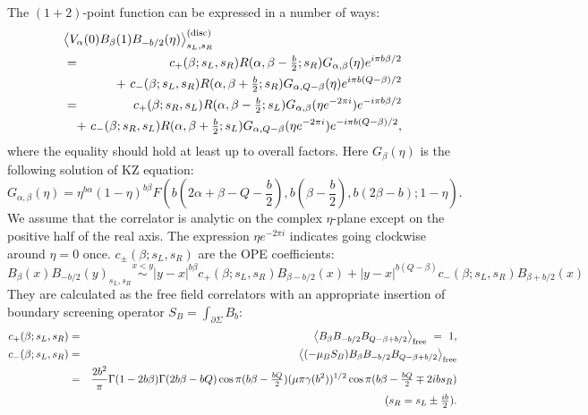 \documentclass[a4paper,11pt]{article}
\newcommand{\vev}[1]{\left<{#1}\right>}
\newcommand{\tfrac}[2]{{\textstyle\frac{#1}{#2}}}
\begin{document}
   The $(1+2)$-point function can be expressed in a number of ways:
\begin{eqnarray}
\lefteqn{
  \vev{V_\alpha(0)B_\beta(1)B_{-b/2}(\eta)}^{\rm (disc)}_{s_L,s_R}
}\nonumber \\
 &=& c_+(\beta;s_L,s_R)R(\alpha,\beta-\tfrac{b}{2};s_R)
     G_{\alpha,\beta}(\eta)e^{i\pi b\beta/2}
 \nonumber \\ && \!\!\!\!\!\!
   +~ c_-(\beta;s_L,s_R)R(\alpha,\beta+\tfrac{b}{2};s_R)
      G_{\alpha,Q-\beta}(\eta)e^{i\pi b(Q-\beta)/2}
 \nonumber \\
 &=& c_+(\beta;s_R,s_L)R(\alpha,\beta-\tfrac{b}{2};s_L)
     G_{\alpha,\beta}(\eta e^{-2\pi i})e^{-i\pi b\beta/2}
 \nonumber \\ &&\!\!\!\!\!\!
  +~ c_-(\beta;s_R,s_L)R(\alpha,\beta+\tfrac{b}{2};s_L)
     G_{\alpha,Q-\beta}(\eta e^{-2\pi i})e^{-i\pi b(Q-\beta)/2},
\end{eqnarray}
 where the equality should hold at least up to overall factors.
 Here $G_\beta(\eta)$ is the following solution of KZ equation:
\begin{equation}
  G_{\alpha,\beta}(\eta) =\eta^{b\alpha}(1-\eta)^{b\beta}
   F\left(b(2\alpha+\beta-Q-\tfrac{b}{2}), b(\beta-\tfrac{b}{2}),
          b(2\beta-b);1-\eta\right).
\end{equation}
 We assume that the correlator is analytic on the complex
 $\eta$-plane except on the positive half of the real axis.
 The expression $\eta e^{-2\pi i}$ indicates going clockwise
 around $\eta=0$ once.
 $c_\pm(\beta;s_L,s_R)$ are the OPE coefficients:
\begin{equation}
  B_\beta(x)B_{-b/2}(y)_{s_L,s_R} \stackrel{x<y}{\sim}
  |y-x|^{b\beta}c_+(\beta;s_L,s_R)B_{\beta-b/2}(x)
 + |y-x|^{b(Q-\beta)}c_-(\beta;s_L,s_R)B_{\beta+b/2}(x)
\end{equation}
 They are calculated as the free field correlators
 with an appropriate insertion of boundary screening operator
 $S_B = \int_{\partial\Sigma}B_b$:
\begin{eqnarray}
  c_+(\beta;s_L,s_R)
  &=& \vev{B_\beta B_{-b/2}B_{Q-\beta+b/2}}_{\rm free}
  ~=~ 1,
 \nonumber \\
  c_-(\beta;s_L,s_R)
  &=& \vev{(-\mu_BS_B)B_\beta B_{-b/2}B_{Q-\beta+b/2}}_{\rm free}
 \nonumber \\
  &=& \frac{2b^2}{\pi}\Gamma(1-2b\beta)\Gamma(2b\beta-bQ)
      \cos\pi(b\beta-\tfrac{bQ}{2})(\mu\pi\gamma(b^2))^{1/2}
      \cos\pi(b\beta-\tfrac{bQ}{2}\mp 2ibs_R)
 \nonumber \\
  & & ~~~~(s_R = s_L \pm \tfrac{ib}{2}).
\end{eqnarray}
\end{document}
